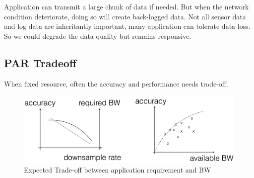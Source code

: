 Application can transmit a large chunk of data if needed. But when the network
condition deteriorate, doing so will create back-logged data. Not all sensor
data and log data are inheritantly important, many application can tolerate data
loss. So we could degrade the data quality but remains responsive.

\subsection{PAR Tradeoff}
\label{sec:par-tradeoff}

When fixed resource, often the accuracy and performance needs trade-off.

\begin{figure}
  \centering
  \includegraphics[width=.95\linewidth]{figures/tradeoff-placeholder.png}
  \caption{Expected Trade-off between application requirement and BW}
  \label{fig:degrade}
\end{figure}

